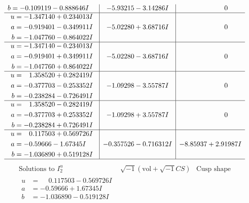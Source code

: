 \documentclass[1p]{elsarticle_modified}
\theoremstyle{definition}
\newcommand{\I}{\sqrt{-1}}
\begin{document}
$$\begin{array}{c|c|c}
\begin{aligned}
b &= -0.109119 - 0.888646 I\end{aligned}
 & -5.93215 - 3.14286 I & \phantom{-0.000000 } 0 \\ \hline\begin{aligned}
u &= -1.347140 + 0.234013 I \\
a &= -0.919401 - 0.349911 I \\
b &= -1.047760 - 0.864022 I\end{aligned}
 & -5.02280 + 3.68716 I & \phantom{-0.000000 } 0 \\ \hline\begin{aligned}
u &= -1.347140 - 0.234013 I \\
a &= -0.919401 + 0.349911 I \\
b &= -1.047760 + 0.864022 I\end{aligned}
 & -5.02280 - 3.68716 I & \phantom{-0.000000 } 0 \\ \hline\begin{aligned}
u &= \phantom{-}1.358520 + 0.282419 I \\
a &= -0.377703 - 0.253352 I \\
b &= -0.238284 - 0.726491 I\end{aligned}
 & -1.09298 - 3.55787 I & \phantom{-0.000000 } 0 \\ \hline\begin{aligned}
u &= \phantom{-}1.358520 - 0.282419 I \\
a &= -0.377703 + 0.253352 I \\
b &= -0.238284 + 0.726491 I\end{aligned}
 & -1.09298 + 3.55787 I & \phantom{-0.000000 } 0 \\ \hline\begin{aligned}
u &= \phantom{-}0.117503 + 0.569726 I \\
a &= -0.59666 - 1.67345 I \\
b &= -1.036890 + 0.519128 I\end{aligned}
 & -0.357526 - 0.716312 I & -8.85937 + 2.91987 I\\
 \hline 
 \end{array}$$\newpage$$\begin{array}{c|c|c}  
\text{Solutions to }I^u_{2}& \I (\text{vol} + \sqrt{-1}CS) & \text{Cusp shape}\\
 \hline 
\begin{aligned}
u &= \phantom{-}0.117503 - 0.569726 I \\
a &= -0.59666 + 1.67345 I \\
b &= -1.036890 - 0.519128 I\end{aligned}

\end{array}$$
\end{document}

